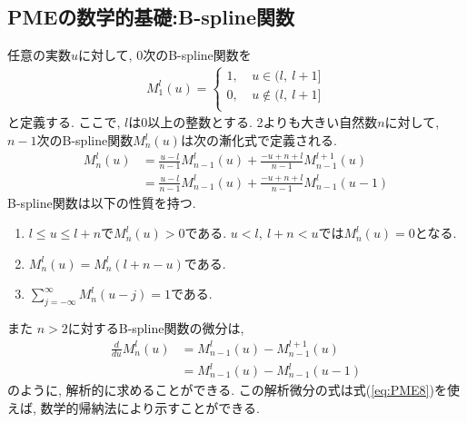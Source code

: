 \subsection{PMEの数学的基礎:B-spline関数}
任意の実数$u$に対して, 0次のB-spline関数を
\begin{align}
  M_{1}^{l} (u)
=
  \begin{cases}
   1,~  & u \in (l,~ l+1] \\
   0,~  & u \notin (l,~ l+1] \\
  \end{cases}
  \label{eq:PME7}
\end{align}
と定義する. ここで, $l$は0以上の整数とする.
2よりも大きい自然数$n$に対して, $n-1$次のB-spline関数$M_{n}^{l}(u)$は次の漸化式で定義される.
\begin{align}
  M_{n}^{l}(u)
&=
  \frac{u-l}{n-1} M_{n-1}^{l} (u) + \frac{-u+n+l}{n-1} M_{n-1}^{l+1} (u)
  \label{eq:PME8}
  \\
&=
  \frac{u-l}{n-1} M_{n-1}^{l} (u) + \frac{-u+n+l}{n-1} M_{n-1}^{l} (u-1)
\end{align}
B-spline関数は以下の性質を持つ.
\begin{enumerate}
 \item $l \le u \le l+n$で$M_{n}^{l}(u)>0$である. $u<l,~ l+n<u$では$M_{n}^{l}(u)=0$となる.
 \item $M_{n}^{l}(u)=M_{n}^{l}(l+n-u)$である.
 \item $\sum_{j=-\infty}^{\infty} M_{n}^{l}(u-j)=1$である.
\end{enumerate}
また
$n>2$に対するB-spline関数の微分は,
\begin{align}
   \frac{d}{du}M_{n}^{l}(u)
 &=
    M_{n-1}^{l}(u) - M_{n-1}^{l+1}(u)
 \label{eq:PME9}
 \\
 &=
    M_{n-1}^{l}(u) - M_{n-1}^{l}(u-1)
\end{align}
のように, 解析的に求めることができる.
この解析微分の式は式(\ref{eq:PME8})を使えば, 数学的帰納法により示すことができる.

